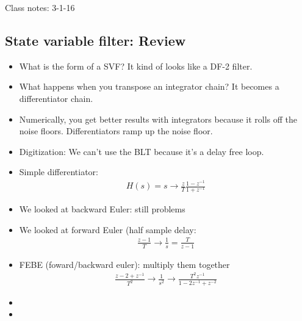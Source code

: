 Class notes: 3-1-16
\subsection*{State variable filter: Review}
\begin{itemize}
\item{What is the form of a SVF? It kind of looks like a DF-2 filter.}
\item{What happens when you transpose an integrator chain? It becomes a differentiator chain. }
\item{Numerically, you get better results with integrators because it rolls off the noise floors.
Differentiators ramp up the noise floor.
}
\item{Digitization: We can't use the BLT because it's a delay free loop.}
\item{Simple differentiator:
    \begin{align*}
    H(s) = s \rightarrow
    \frac{z}{T} \frac{1 - z^{-1}}{1 + z^{-1}}
    \end{align*}
}
\item{We looked at backward Euler: still problems}
\item{We looked at forward Euler (half sample delay:
    \begin{align*}
        \frac{z - 1 }{T} \rightarrow \frac{1}{s} = \frac{T}{z - 1}
    \end{align*}
}
\item{FEBE (foward/backward euler): multiply them together
    \begin{align*}
        \frac{z - 2 + z^{-1}}{T^2} 
        \rightarrow 
        \frac{1}{s^2} 
        \rightarrow 
        \frac{T^2 z^{-1}}{1 - 2z^{-1} + z^{-2}}
    \end{align*}
}
\item{}
\item{}
\end{itemize}

